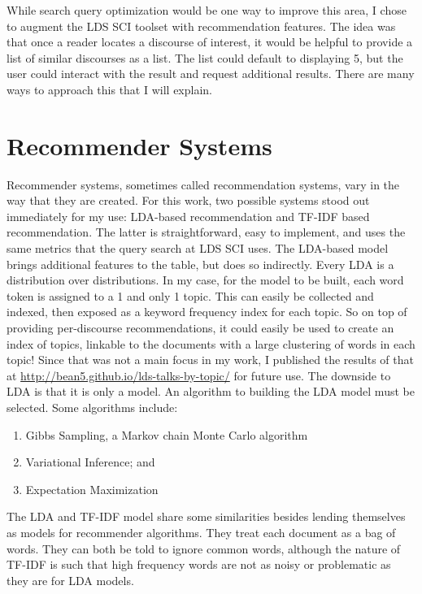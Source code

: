 While search query optimization would be one way to improve this area, I chose to augment the LDS SCI toolset with recommendation features. The idea was that once a reader locates a discourse of interest, it would be helpful to provide a list of similar discourses as a list. The list could default to displaying 5, but the user could interact with the result and request additional results. There are many ways to approach this that I will explain.

\section{Recommender Systems}
Recommender systems, sometimes called recommendation systems, vary in the way that they are created. For this work, two possible systems stood out immediately for my use: LDA-based recommendation and TF-IDF based recommendation. The latter is straightforward, easy to implement, and uses the same metrics that the query search at LDS SCI uses. The LDA-based model brings additional features to the table, but does so indirectly. Every LDA is a distribution over distributions. In my case, for the model to be built, each word token is assigned to a 1 and only 1 topic. This can easily be collected and indexed, then exposed as a keyword frequency index for each topic. So on top of providing per-discourse recommendations, it could easily be used to create an index of topics, linkable to the documents with a large clustering of words in each topic! Since that was not a main focus in my work, I published the results of that at \url{http://bean5.github.io/lds-talks-by-topic/} for future use. The downside to LDA is that it is only a model. An algorithm to building the LDA model must be selected. Some algorithms include:

\begin{enumerate}
  \item Gibbs Sampling, a Markov chain Monte Carlo algorithm
  \item Variational Inference; and
  \item Expectation Maximization
\end{enumerate}

The LDA and TF-IDF model share some similarities besides lending themselves as models for recommender algorithms. They treat each document as a bag of words. They can both be told to ignore common words, although the nature of TF-IDF is such that high frequency words are not as noisy or problematic as they are for LDA models.

